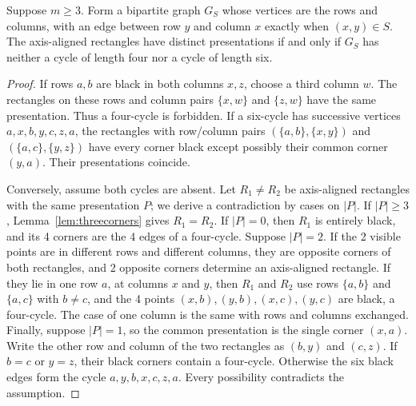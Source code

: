 \begin{lemma}\label{lem:girth}
Suppose $m\ge3$. Form a bipartite graph $G_S$ whose vertices are the rows and
columns, with an edge between row $y$ and column $x$ exactly when $(x,y)\in S$.
The axis-aligned rectangles have distinct presentations if and only if $G_S$
has neither a cycle of length four nor a cycle of length six.
\end{lemma}
\begin{proof}
If rows $a,b$ are black in both columns $x,z$, choose a third column $w$.
The rectangles on these rows and column pairs $\{x,w\}$ and $\{z,w\}$
have the same presentation. Thus a four-cycle is forbidden.
If a six-cycle has successive vertices
$a,x,b,y,c,z,a$, the rectangles with row/column pairs
$(\{a,b\},\{x,y\})$ and $(\{a,c\},\{y,z\})$ have every corner black
except possibly their common corner $(y,a)$. Their presentations coincide.

Conversely, assume both cycles are absent. Let $R_1\ne R_2$ be axis-aligned
rectangles with the same presentation $P$; we derive a contradiction by
cases on $|P|$. If $|P|\ge3$, Lemma~\ref{lem:threecorners} gives $R_1=R_2$.
If $|P|=0$, then $R_1$ is entirely black, and its 4 corners are the 4
edges of a four-cycle. Suppose $|P|=2$. If the 2 visible points are in different rows and
different columns, they are opposite corners of both rectangles, and 2
opposite corners determine an axis-aligned rectangle. If they lie in one row
$a$, at columns $x$ and $y$, then $R_1$ and $R_2$ use rows $\{a,b\}$ and
$\{a,c\}$ with $b\ne c$, and the 4 points $(x,b),(y,b),(x,c),(y,c)$ are black, a
four-cycle. The case of one column is the same with rows and columns exchanged. Finally, suppose $|P|=1$, so the common presentation is the single corner $(x,a)$.
Write the other row and column of the two rectangles as $(b,y)$ and $(c,z)$.
If $b=c$ or $y=z$, their black corners contain a four-cycle. Otherwise the six
black edges form the cycle $a,y,b,x,c,z,a$. Every possibility contradicts the
assumption.
\end{proof}

